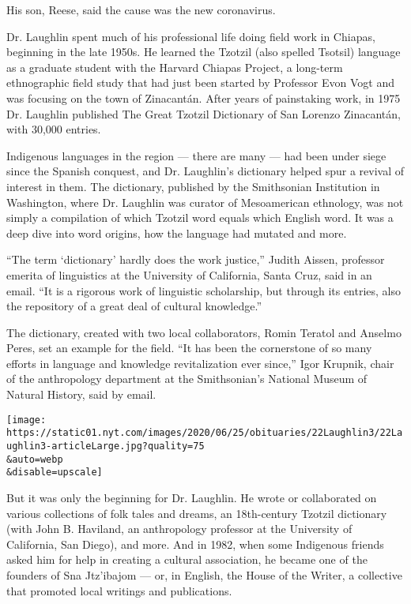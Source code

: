 His son, Reese, said the cause was the new coronavirus.

Dr. Laughlin spent much of his professional life doing field work in
Chiapas, beginning in the late 1950s. He learned the Tzotzil (also
spelled Tsotsil) language as a graduate student with the Harvard Chiapas
Project, a long-term ethnographic field study that had just been started
by Professor Evon Vogt and was focusing on the town of Zinacantán. After
years of painstaking work, in 1975 Dr. Laughlin published The Great
Tzotzil Dictionary of San Lorenzo Zinacantán, with 30,000 entries.

Indigenous languages in the region --- there are many --- had been under
siege since the Spanish conquest, and Dr. Laughlin's dictionary helped
spur a revival of interest in them. The dictionary, published by the
Smithsonian Institution in Washington, where Dr. Laughlin was curator of
Mesoamerican ethnology, was not simply a compilation of which Tzotzil
word equals which English word. It was a deep dive into word origins,
how the language had mutated and more.

``The term `dictionary' hardly does the work justice,'' Judith Aissen,
professor emerita of linguistics at the University of California, Santa
Cruz, said in an email. ``It is a rigorous work of linguistic
scholarship, but through its entries, also the repository of a great
deal of cultural knowledge.''

The dictionary, created with two local collaborators, Romin Teratol and
Anselmo Peres, set an example for the field. ``It has been the
cornerstone of so many efforts in language and knowledge revitalization
ever since,'' Igor Krupnik, chair of the anthropology department at the
Smithsonian's National Museum of Natural History, said by email.

\texttt{[image: https://static01.nyt.com/images/2020/06/25/obituaries/22Laughlin3/22Laughlin3-articleLarge.jpg?quality=75\\\&auto=webp\\\&disable=upscale]}

But it was only the beginning for Dr. Laughlin. He wrote or collaborated
on various collections of folk tales and dreams, an 18th-century Tzotzil
dictionary (with John B. Haviland, an anthropology professor at the
University of California, San Diego), and more. And in 1982, when some
Indigenous friends asked him for help in creating a cultural
association, he became one of the founders of Sna Jtz'ibajom --- or, in
English, the House of the Writer, a collective that promoted local
writings and publications.

